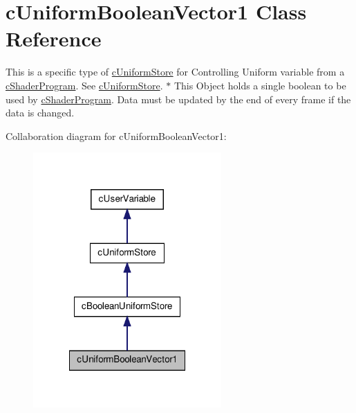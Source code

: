 \hypertarget{classc_uniform_boolean_vector1}{
\section{cUniformBooleanVector1 Class Reference}
\label{classc_uniform_boolean_vector1}
}


This is a specific type of \hyperlink{classc_uniform_store}{cUniformStore} for Controlling Uniform variable from a \hyperlink{classc_shader_program}{cShaderProgram}. See \hyperlink{classc_uniform_store}{cUniformStore}. $\ast$ This Object holds a single boolean to be used by \hyperlink{classc_shader_program}{cShaderProgram}. Data must be updated by the end of every frame if the data is changed.  




Collaboration diagram for cUniformBooleanVector1:\nopagebreak
\begin{figure}[H]
\begin{center}
\leavevmode
\includegraphics[width=204pt]{classc_uniform_boolean_vector1__coll__graph}
\end{center}
\end{figure}
